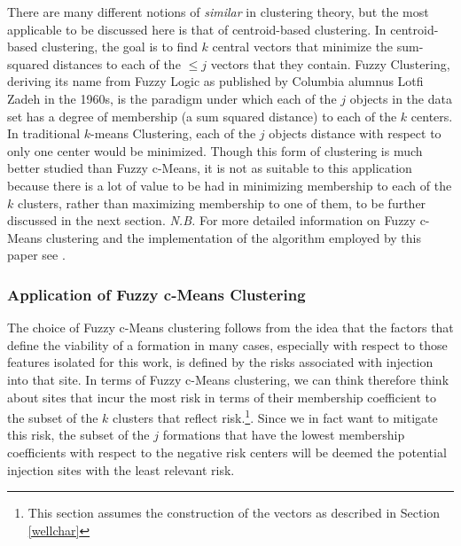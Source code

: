 \documentclass[letterpaper, 12pt]{article}
\begin{document}
\par There are many different notions of \emph{similar} in clustering theory, but the most applicable to be discussed here is that of centroid-based clustering. In centroid-based clustering, the goal is to find $k$ central vectors that minimize the sum-squared distances to each of the $\leq j$ vectors that they contain. Fuzzy Clustering, deriving its name from Fuzzy Logic as published by Columbia alumnus Lotfi Zadeh in the 1960s, is the paradigm under which each of the $j$ objects in the data set has a degree of membership (a sum squared distance) to each of the $k$ centers. In traditional $k$-means Clustering, each of the $j$ objects distance with respect to only one center would be minimized. Though this form of clustering is much better studied than Fuzzy c-Means, it is not as suitable to this application because there is a lot of value to be had in minimizing membership to each of the $k$ clusters, rather than maximizing membership to one of them, to be further discussed in the next section.  
\emph{N.B.} For more detailed information on Fuzzy c-Means clustering and the implementation of the algorithm employed by this paper see \cite{cmeanspaper}. 

\subsubsection{Application of Fuzzy c-Means Clustering} 
\par The choice of Fuzzy c-Means clustering follows from the idea that the factors that define the viability of a formation in many cases, especially with respect to those features isolated for this work, is defined by the risks associated with injection into that site. In terms of Fuzzy c-Means clustering, we can think therefore think about sites that incur the most risk in terms of their membership coefficient to the subset of the $k$ clusters that reflect risk.\footnote{This section assumes the construction of the vectors as described in Section \ref{wellchar}}. Since we in fact want to mitigate this risk, the subset of the $j$ formations that have the lowest membership coefficients with respect to the negative risk centers will be deemed the potential injection sites with the least relevant risk.
\end{document}
